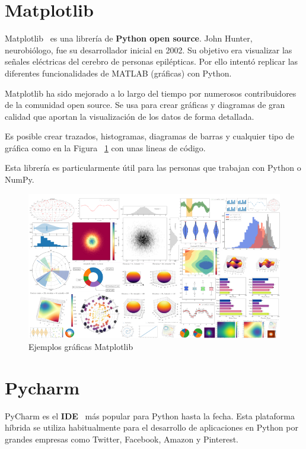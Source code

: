 \documentclass[a4paper, 12pt]{book}
\begin{document}
\section{Matplotlib} 
\label{sec:matplotlib}


Matplotlib~\cite{python:_matplotlib} es una librería de \textbf{Python open source}. John Hunter, neurobiólogo, fue su desarrollador inicial en 2002. Su objetivo era visualizar las señales eléctricas del cerebro de personas epilépticas. Por ello intentó replicar las diferentes funcionalidades de MATLAB (gráficas) con Python. 

Matplotlib ha sido mejorado a lo largo del tiempo por numerosos contribuidores de la comunidad open source. Se usa para crear gráficas y diagramas de gran calidad que aportan la visualización de los datos de  forma detallada.

Es posible crear trazados, histogramas, diagramas de barras y cualquier tipo de gráfica como en la Figura ~\ref{fig:matplotlib} con unas lineas de código.

Esta librería es particularmente útil para las personas que trabajan con Python o NumPy.

\begin{figure}[hb]
	\centering
	\includegraphics[width=14cm, keepaspectratio]{img/Matplotlib.png}
	\caption{Ejemplos gráficas Matplotlib}
	\label{fig:matplotlib}
\end{figure}

\section{Pycharm} 
\label{sec:pycharm}

PyCharm es el \textbf{IDE}~\cite{python:_pycharm} más popular para Python hasta la fecha. Esta plataforma híbrida se utiliza habitualmente para el desarrollo de aplicaciones en Python por grandes empresas como Twitter, Facebook, Amazon y Pinterest.
\end{document}
